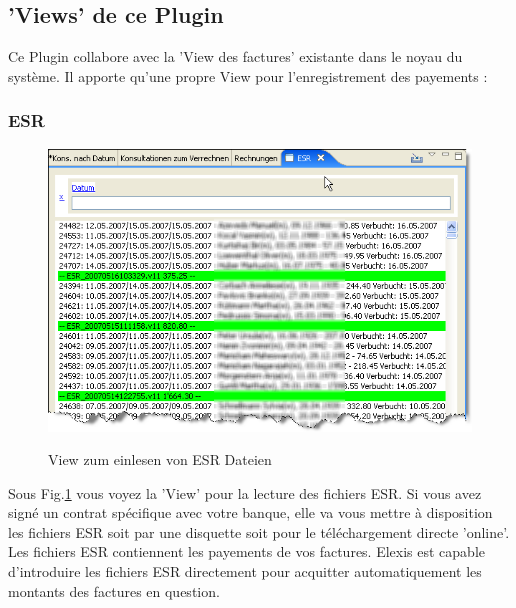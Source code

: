 \subsection{'Views' de ce Plugin}
Ce Plugin collabore avec la 'View des factures' existante dans le noyau du système. Il apporte qu'une propre View pour l'enregistrement des payements :

\subsubsection{ESR}
\begin{figure}[hb]
  \includegraphics{images/esr1}\\
  \caption{View zum einlesen von ESR Dateien}\label{fig:esr}
\end{figure}

 Sous Fig.\ref{fig:esr} vous voyez la 'View' pour la lecture des fichiers ESR. Si vous avez signé un contrat spécifique avec votre banque, elle va vous mettre à disposition les fichiers ESR soit par une disquette soit pour le téléchargement directe 'online'. Les fichiers ESR contiennent les payements de vos factures. Elexis est capable d'introduire les fichiers ESR directement pour acquitter automatiquement les montants des factures en question.

